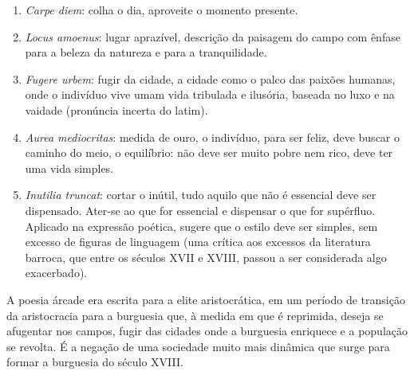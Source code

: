 \documentclass[12pt]{book}
\begin{document}
		\begin{enumerate}
			\item \textit{Carpe diem}: colha o dia, aproveite o momento presente.
			\item \textit{Locus amoenus}: lugar aprazível, descrição da paisagem do campo com ênfase para a beleza da natureza e para a tranquilidade.
			\item \textit{Fugere urbem}: fugir da cidade, a cidade como o palco das paixões humanas, onde o indivíduo vive umam vida tribulada e ilusória, baseada no luxo e na vaidade (pronúncia incerta do latim).
			\item \textit{Aurea mediocritas}: medida de ouro, o indivíduo, para ser feliz, deve buscar o caminho do meio, o equilíbrio: não deve ser muito pobre nem rico, deve ter uma vida simples.
			\item \textit{Inutilia truncat}: cortar o inútil, tudo aquilo que não é essencial deve ser dispensado. Ater-se ao que for essencial e dispensar o que for supérfluo. Aplicado na expressão poética, sugere que o estilo deve ser simples, sem excesso de figuras de linguagem (uma crítica aos excessos da literatura barroca, que entre os séculos XVII e XVIII, passou a ser considerada algo exacerbado).
		\end{enumerate}
		\par A poesia árcade era escrita para a elite aristocrática, em um período de transição da aristocracia para a burguesia que, à medida em que é reprimida, deseja se afugentar nos campos, fugir das cidades onde a burguesia enriquece e a população se revolta. É a negação de uma sociedade muito mais dinâmica que surge para formar a burguesia do século XVIII.
		\settowidth{\versewidth}{Envolto nos seus úmidos vapores}
\end{document}
